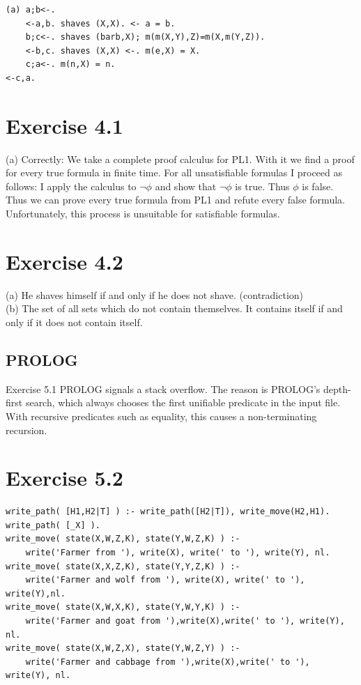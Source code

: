 \documentclass[10pt]{book}
\begin{document}
\begin{verbatim}
(a) a;b<-.
    <-a,b. shaves (X,X). <- a = b.
    b;c<-. shaves (barb,X); m(m(X,Y),Z)=m(X,m(Y,Z)).
    <-b,c. shaves (X,X) <-. m(e,X) = X.
    c;a<-. m(n,X) = n.
<-c,a.
\end{verbatim}

\section{Exercise 4.1}
(a) Correctly: We take a complete proof calculus for PL1. With it we find a proof for every true formula in finite time. For all unsatisfiable formulas I proceed as follows: I apply the calculus to $\neg \phi$ and show that $\neg \phi$ is true. Thus $\phi$ is false. Thus we can prove every true formula from PL1 and refute every false formula. Unfortunately, this process is unsuitable for satisfiable formulas.

\section{Exercise 4.2}
(a) He shaves himself if and only if he does not shave. (contradiction)\\
(b) The set of all sets which do not contain themselves. It contains itself if and only if it does not contain itself.

\subsection{PROLOG}
Exercise 5.1 PROLOG signals a stack overflow. The reason is PROLOG's depth-first search, which always chooses the first unifiable predicate in the input file. With recursive predicates such as equality, this causes a non-terminating recursion.

\section{Exercise 5.2}
\begin{verbatim}
write_path( [H1,H2|T] ) :- write_path([H2|T]), write_move(H2,H1).
write_path( [_X] ).
write_move( state(X,W,Z,K), state(Y,W,Z,K) ) :-
    write('Farmer from '), write(X), write(' to '), write(Y), nl.
write_move( state(X,X,Z,K), state(Y,Y,Z,K) ) :-
    write('Farmer and wolf from '), write(X), write(' to '), write(Y),nl.
write_move( state(X,W,X,K), state(Y,W,Y,K) ) :-
    write('Farmer and goat from '),write(X),write(' to '), write(Y), nl.
write_move( state(X,W,Z,X), state(Y,W,Z,Y) ) :-
    write('Farmer and cabbage from '),write(X),write(' to '), write(Y), nl.
\end{verbatim}
\end{document}
